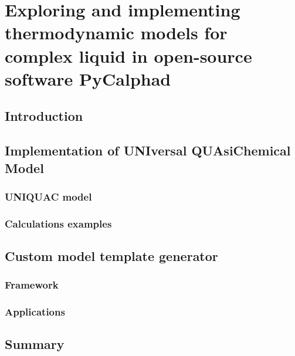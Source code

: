 \chapter{Exploring and implementing thermodynamic models for complex liquid in open-source software PyCalphad} \label{chap:models}

\section{Introduction} \label{models:sec:intro}

\section{Implementation of UNIversal QUAsiChemical Model} \label{models:sec:UNIQUAC}


\subsection{UNIQUAC model} \label{models:ssec:UNIQUACfund}


\subsection{Calculations examples} \label{models:ssec:UNIQUACexamples}


\section{Custom model template generator} \label{models:sec:CMTG}


\subsection{Framework} \label{models:ssec:CMTGframework}


\subsection{Applications} \label{models:ssec:CMTGapp}


\section{Summary} \label{intermetallics:sec:Summary}

